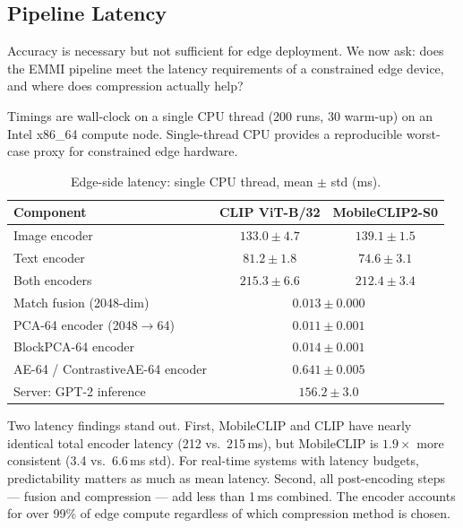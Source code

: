 \documentclass[10pt,twocolumn]{article}
\begin{document}
\subsection{Pipeline Latency}

Accuracy is necessary but not sufficient for edge deployment. We now ask:
does the EMMI pipeline meet the latency requirements of a constrained
edge device, and where does compression actually help?

Timings are wall-clock on a single CPU thread (200 runs, 30 warm-up) on
an Intel x86\_64 compute node. Single-thread CPU provides a reproducible
worst-case proxy for constrained edge hardware.

\begin{table}[h]
\centering
\caption{Edge-side latency: single CPU thread, mean $\pm$ std (ms).}
\label{tab:latency_edge}
\begin{tabular}{lcc}
\toprule
Component & CLIP ViT-B/32 & MobileCLIP2-S0 \\
\midrule
Image encoder     & $133.0 \pm 4.7$  & $139.1 \pm 1.5$ \\
Text encoder      & $81.2  \pm 1.8$  & $74.6  \pm 3.1$ \\
Both encoders     & $215.3 \pm 6.6$  & $\mathbf{212.4 \pm 3.4}$ \\
\midrule
Match fusion (2048-dim)           & \multicolumn{2}{c}{$0.013 \pm 0.000$} \\
PCA-64 encoder (2048$\to$64)      & \multicolumn{2}{c}{$0.011 \pm 0.001$} \\
BlockPCA-64 encoder               & \multicolumn{2}{c}{$0.014 \pm 0.001$} \\
AE-64 / ContrastiveAE-64 encoder  & \multicolumn{2}{c}{$0.641 \pm 0.005$} \\
\midrule
Server: GPT-2 inference           & \multicolumn{2}{c}{$156.2 \pm 3.0$} \\
\bottomrule
\end{tabular}
\end{table}

Two latency findings stand out. First, MobileCLIP and CLIP have nearly
identical total encoder latency (212 vs.\ 215\,ms), but MobileCLIP is
$1.9\times$ more consistent (3.4 vs.\ 6.6\,ms std). For real-time systems
with latency budgets, predictability matters as much as mean latency.
Second, all post-encoding steps --- fusion and compression --- add less than
1\,ms combined. The encoder accounts for over 99\% of edge compute
regardless of which compression method is chosen.
\end{document}
